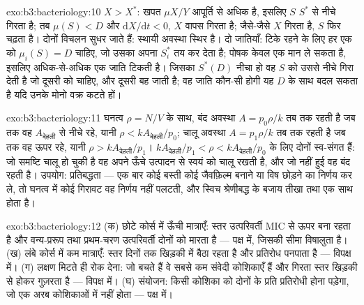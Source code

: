 \begin{solution}{exo:b3:bacteriology:10}
$X > X^{*}$: खपत $\mu X/Y$ आपूर्ति से अधिक है, इसलिए $S$ $S^{*}$ से
नीचे गिरता है; तब $\mu(S) < D$ और $\mathrm{d}X/\mathrm{d}t < 0$, $X$
वापस गिरता है; जैसे-जैसे $X$ गिरता है, $S$ फिर चढ़ता है। दोनों विचलन
सुधर जाते हैं: स्थायी अवस्था स्थिर है। दो जातियाँ: टिके रहने के लिए हर
एक को $\mu_{i}(S) = D$ चाहिए, जो उसका अपना $S_{i}^{*}$ तय कर देता है;
पोषक केवल एक मान ले सकता है, इसलिए अधिक-से-अधिक एक जाति टिकती है। जिसका
$S^{*}(D)$ नीचा हो वह $S$ को उससे नीचे गिरा देती है जो दूसरी को चाहिए,
और दूसरी बह जाती है; वह जाति कौन-सी होगी यह $D$ के साथ बदल सकता है यदि
उनके मोनो वक्र कटते हों।
\end{solution}

\begin{solution}{exo:b3:bacteriology:11}
घनत्व $\rho = N/V$ के साथ, बंद अवस्था $A = p_{0}\rho/k$ तब तक रहती है
जब तक वह $A_{\text{देहली}}$ से नीचे रहे, यानी $\rho < kA_{\text{देहली}}/p_{0}$;
चालू अवस्था $A = p_{1}\rho/k$ तब तक रहती है जब तक वह ऊपर रहे, यानी $\rho
> kA_{\text{देहली}}/p_{1}$। $kA_{\text{देहली}}/p_{1} < \rho <
kA_{\text{देहली}}/p_{0}$ के लिए दोनों स्व-संगत हैं: जो समष्टि चालू हो
चुकी है वह अपने ऊँचे उत्पादन से स्वयं को चालू रखती है, और जो नहीं हुई
वह बंद रहती है। उपयोग: प्रतिबद्धता --- एक बार कोई बस्ती कोई जैवफ़िल्म
बनाने या विष छोड़ने का निर्णय कर ले, तो घनत्व में कोई गिरावट वह निर्णय
नहीं पलटती, और स्विच श्रेणीबद्ध के बजाय तीखा तथा एक साथ होता है।
\end{solution}

\begin{solution}{exo:b3:bacteriology:12}
(क) छोटे कोर्स में ऊँची मात्राएँ: स्तर उत्परिवर्ती MIC से ऊपर बना रहता
है और वन्य-प्ररूप तथा प्रथम-चरण उत्परिवर्ती दोनों को मारता है ---
पक्ष में, जिसकी सीमा विषालुता है। (ख) लंबे कोर्स में कम मात्राएँ: स्तर
दिनों तक खिड़की में बैठा रहता है और प्रतिरोध पनपाता है --- विपक्ष में।
(ग) लक्षण मिटते ही रोक देना: जो बचते हैं वे सबसे कम संवेदी कोशिकाएँ हैं
और गिरता स्तर खिड़की से होकर गुज़रता है --- विपक्ष में। (घ) संयोजन:
किसी कोशिका को दोनों के प्रति प्रतिरोधी होना पड़ेगा, जो एक अरब कोशिकाओं
में नहीं होता --- पक्ष में।
\end{solution}

